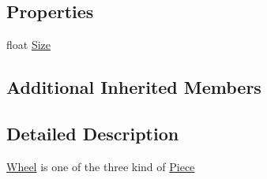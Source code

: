 \subsection*{Properties}
\begin{DoxyCompactItemize}
\item 
float \hyperlink{classgearit_1_1src_1_1robot_1_1_wheel_a515a60157083e20f1a6ce6869b673763}{Size}
\end{DoxyCompactItemize}
\subsection*{Additional Inherited Members}


\subsection{Detailed Description}
\hyperlink{classgearit_1_1src_1_1robot_1_1_wheel}{Wheel} is one of the three kind of \hyperlink{classgearit_1_1src_1_1robot_1_1_piece}{Piece} 




